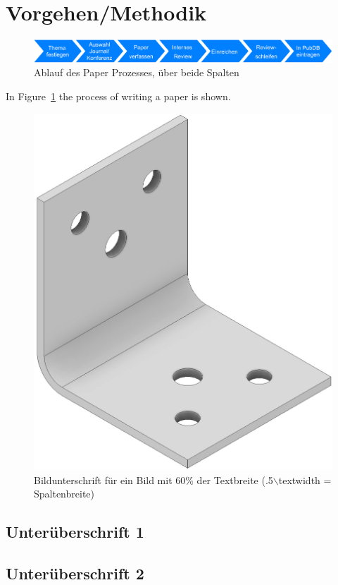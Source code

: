 \section{Vorgehen/Methodik}
\begin{figure}[tb!]
	\includegraphics[width=\textwidth]{figures/paperflow_drawio.pdf}
	\caption{Ablauf des Paper Prozesses, über beide Spalten}
	\label{fig:process}
\end{figure}

\lipsum[6]
In Figure~\ref{fig:process} the process of writing a paper is shown.

\begin{figure}[htb]
	\centering
	\includegraphics[width=.3\textwidth]{figures/example.jpg}
	\caption{Bildunterschrift für ein Bild mit 60\% der Textbreite (.5$\backslash$textwidth = Spaltenbreite)}
	\label{fig:example}
\end{figure}

\subsection{Unterüberschrift 1}
\lipsum[7]

\subsection{Unterüberschrift 2}
\lipsum[8]
